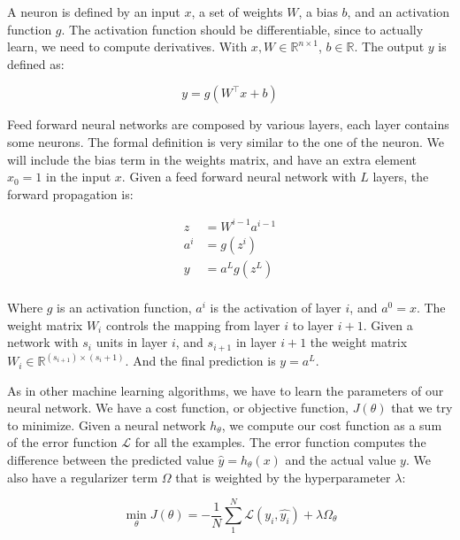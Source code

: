 A neuron is defined by an input $x$, a set of weights $W$, a bias $b$, and an activation function $g$. The activation function should be differentiable, since to actually learn, we need to compute derivatives. With $x, W \in \mathbb{R}^{n\times1}$, $b \in \mathbb{R}$. The output $y$ is defined as: 

\begin{equation}
    y = g(W^{\intercal} x + b)
\end{equation}


Feed forward neural networks are composed by various layers, each layer contains some neurons. The formal definition is very similar to the one of the neuron. We will include the bias term in the weights matrix, and have an extra element $x_0 = 1$ in the input $x$. Given a feed forward neural network with $L$ layers, the forward propagation is: 

\begin{equation}
\begin{split}
    z & = W^{i-1}a^{i-1} \\
    a^{i} & = g(z^i) \\
    y & = a^L g(z^L) \\
\end{split}
\end{equation}

Where $g$ is an activation function, $a^i$ is the activation of layer $i$, and $a^0 = x$. The weight matrix $W_i$ controls the mapping from layer $i$ to layer $i+1$. Given a network with $s_i$ units in layer $i$, and $s_{i+1}$ in layer $i+1$ the weight matrix $W_i \in\mathbb{R}^{(s_{i+1})\times (s_i + 1)} $. And the final prediction is $y = a^{L}$. 

As in other machine learning algorithms, we have to learn the parameters of our neural network. We have a cost function, or objective function, $J(\theta)$ that we try to minimize. Given a neural network $h_\theta$, we compute our cost function as a sum of the error function  $\mathcal{L}$ for all the examples. The error function computes the difference between the predicted value $\hat{y} = h_{\theta}(x)$ and the actual value $y$. We also have a regularizer term $\Omega$ that is weighted by the hyperparameter $\lambda$:

\begin{equation}
    \min_{\theta} J(\theta) = - \frac{1}{N} \sum_{1}^{N} \mathcal{L}(y_i, \hat{y_i}) + \lambda \Omega_\theta
\end{equation}

